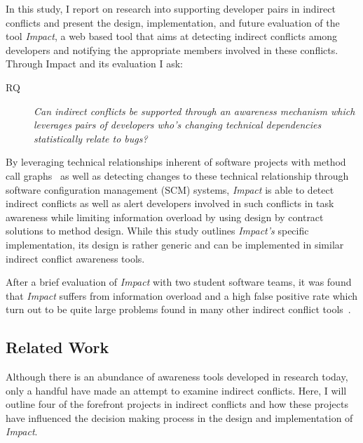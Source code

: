 In this study, I report on research into supporting developer pairs in indirect conflicts
and present the design, implementation, and future evaluation of the tool \textit{Impact},
a web based tool that aims at detecting indirect conflicts among developers
and notifying the appropriate members involved in these conflicts. Through Impact and
its evaluation I ask:

\begin{description}
        \item[RQ] \textit{Can indirect conflicts be supported 
        through an awareness mechanism which leverages pairs of developers who's changing technical 
        dependencies statistically relate to bugs?}
\end{description}

By leveraging technical relationships inherent of 
software projects with method call graphs~\cite{Lakhotia:1993:CCM}
as well as detecting changes
to these technical relationship through software configuration management
(SCM) systems, \textit{Impact} is able to detect indirect conflicts as well as
alert developers involved in such conflicts in task awareness while limiting information
overload by using design by contract~\cite{Meyer:1988} solutions to method design. While this study
outlines \textit{Impact's} specific implementation, its design is rather
generic and can be implemented in similar indirect conflict awareness tools.

After a brief evaluation of \textit{Impact} with two student software teams, it was
found that \textit{Impact} suffers from information overload and a high false positive rate which turn out to be quite
large problems found in many other indirect conflict
tools~\cite{Sarma:2007:TSA, Holmes:2010:CAR, Trainer:2005:BGT, Servant:2010:CPI, Borici:2012:CHA}.

\subsection{Related Work}
Although there is an abundance of awareness tools developed in research
today, only a handful have made an attempt to examine indirect conflicts.
Here, I will outline four of the forefront projects in indirect conflicts
and how these projects have influenced the decision making process in
the design and implementation of \textit{Impact}.

